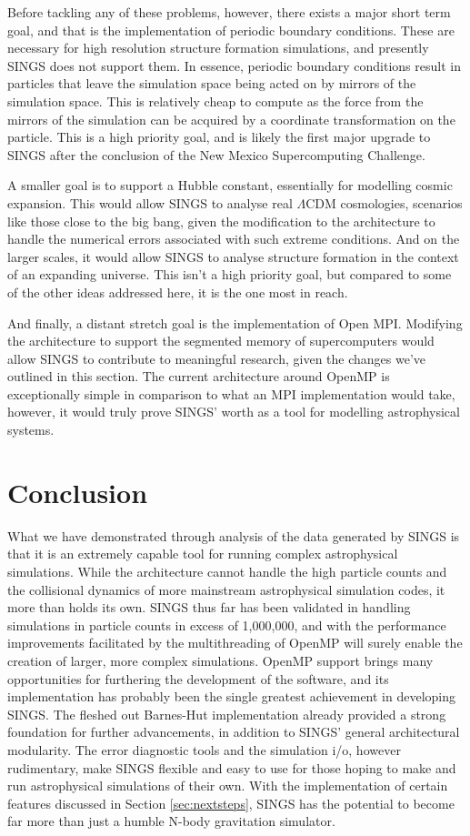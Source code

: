 \documentclass[12pt, twoside, letterpaper]{article}
\begin{document}
Before tackling any of these problems, however, there exists a major short term goal, and that is the implementation of periodic boundary conditions. These are necessary for high resolution structure formation simulations, and presently SINGS does not support them. In essence, periodic boundary conditions result in particles that leave the simulation space being acted on by mirrors of the simulation space. This is relatively cheap to compute as the force from the mirrors of the simulation can be acquired by a coordinate transformation on the particle. This is a high priority goal, and is likely the first major upgrade to SINGS after the conclusion of the New Mexico Supercomputing Challenge.

A smaller goal is to support a Hubble constant, essentially for modelling cosmic expansion. This would allow SINGS to analyse real $\Lambda$CDM cosmologies, scenarios like those close to the big bang, given the modification to the architecture to handle the numerical errors associated with such extreme conditions. And on the larger scales, it would allow SINGS to analyse structure formation in the context of an expanding universe. This isn't a high priority goal, but compared to some of the other ideas addressed here, it is the one most in reach.

And finally, a distant stretch goal is the implementation of Open MPI. Modifying the architecture to support the segmented memory of supercomputers would allow SINGS to contribute to meaningful research, given the changes we've outlined in this section. The current architecture around OpenMP is exceptionally simple in comparison to what an MPI implementation would take, however, it would truly prove SINGS' worth as a tool for modelling astrophysical systems.

\section{Conclusion} \label{sec:conclusion}
What we have demonstrated through analysis of the data generated by SINGS is that it is an extremely capable tool for running complex astrophysical simulations. While the architecture cannot handle the high particle counts and the collisional dynamics of more mainstream astrophysical simulation codes, it more than holds its own. SINGS thus far has been validated in handling simulations in particle counts in excess of 1,000,000, and with the performance improvements facilitated by the multithreading of OpenMP will surely enable the creation of larger, more complex simulations. OpenMP support brings many opportunities for furthering the development of the software, and its implementation has probably been the single greatest achievement in developing SINGS. The fleshed out Barnes-Hut implementation already provided a strong foundation for further advancements, in addition to SINGS' general architectural modularity. The error diagnostic tools and the simulation i/o, however rudimentary, make SINGS flexible and easy to use for those hoping to make and run astrophysical simulations of their own. With the implementation of certain features discussed in Section \ref{sec:nextsteps}, SINGS has the potential to become far more than just a humble N-body gravitation simulator.
\end{document}
